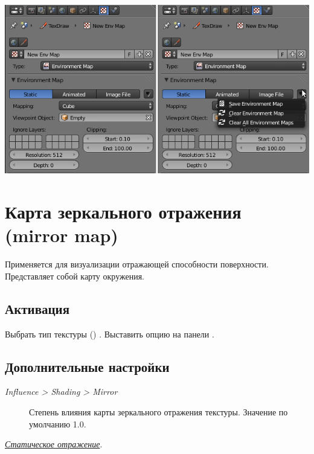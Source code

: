 \documentclass[a4paper,12pt,oneside]{sphinxmanual}
\begin{document}
{\hfill\includegraphics[width=1.000\linewidth]{environment_map_baking_ui.jpg}\hfill}


\section{Карта зеркального отражения (mirror map)}
\label{textures:id19}\label{textures:mirror-map}\label{textures:index-11}
Применяется для визуализации отражающей способности поверхности. Представляет собой карту окружения.


\subsection{Активация}
\label{textures:id20}
Выбрать тип текстуры () . Выставить опцию  на панели .


\subsection{Дополнительные настройки}
\label{textures:id21}\begin{description}
\item[{\emph{Influence \textgreater{} Shading \textgreater{} Mirror}}] \leavevmode
Степень влияния карты зеркального отражения текстуры. Значение по умолчанию 1.0.

\end{description}




{\hyperref[materials:reflection-static]{\emph{Статическое отражение}}}.
\end{document}
